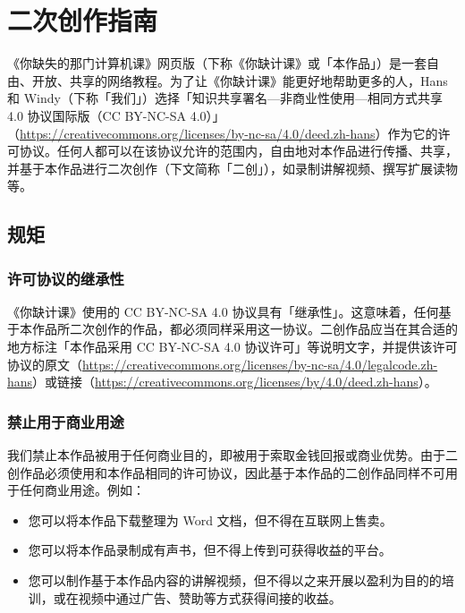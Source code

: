 \chapter{二次创作指南}
\label{cha:adapt-guide}

《你缺失的那门计算机课》网页版（下称《你缺计课》或「本作品」）是一套自由、开放、共享的网络教程。为了让《你缺计课》能更好地帮助更多的人，Hans 和 Windy（下称「我们」）选择「知识共享署名—非商业性使用—相同方式共享 4.0 协议国际版（CC BY-NC-SA 4.0）」（\url{https://creativecommons.org/licenses/by-nc-sa/4.0/deed.zh-hans}）作为它的许可协议。任何人都可以在该协议允许的范围内，自由地对本作品进行传播、共享，并基于本作品进行二次创作（下文简称「二创」），如录制讲解视频、撰写扩展读物等。

\section{规矩}

\subsection{许可协议的继承性}

《你缺计课》使用的 CC BY-NC-SA 4.0 协议具有「继承性」。这意味着，任何基于本作品所二次创作的作品，都必须同样采用这一协议。二创作品应当在其合适的地方标注「本作品采用 CC BY-NC-SA 4.0 协议许可」等说明文字，并提供该许可协议的原文（\url{https://creativecommons.org/licenses/by-nc-sa/4.0/legalcode.zh-hans}）或链接（\url{https://creativecommons.org/licenses/by/4.0/deed.zh-hans}）。

\subsection{禁止用于商业用途}

我们禁止本作品被用于任何商业目的，即被用于索取金钱回报或商业优势。由于二创作品必须使用和本作品相同的许可协议，因此基于本作品的二创作品同样不可用于任何商业用途。例如：

\begin{itemize}
  \item 您可以将本作品下载整理为 Word 文档，{\color{MissingRed}但不得在互联网上售卖}。
  \item 您可以将本作品录制成有声书，{\color{MissingRed}但不得上传到可获得收益的平台}。
  \item 您可以制作基于本作品内容的讲解视频，{\color{MissingRed}但不得以之来开展以盈利为目的的培训，或在视频中通过广告、赞助等方式获得间接的收益}。
\end{itemize}

